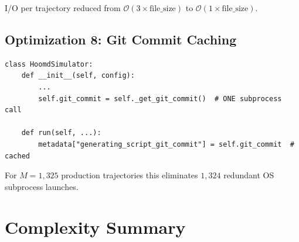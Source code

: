 \documentclass[12pt,a4paper]{article}
\newcommand{\Obig}[1]{\mathcal{O}\!\left(#1\right)}
\begin{document}
I/O per trajectory reduced from $\Obig{3\times\text{file\_size}}$ to
$\Obig{1\times\text{file\_size}}$.

\subsection{Optimization 8: Git Commit Caching}
\label{sec:git}

\begin{lstlisting}[caption={Git metadata caching.}]
class HoomdSimulator:
    def __init__(self, config):
        ...
        self.git_commit = self._get_git_commit()  # ONE subprocess call

    def run(self, ...):
        metadata["generating_script_git_commit"] = self.git_commit  # cached
\end{lstlisting}

For $M = 1{,}325$ production trajectories this eliminates $1{,}324$ redundant
OS subprocess launches.

\section{Complexity Summary}
\label{sec:summary}
\end{document}
